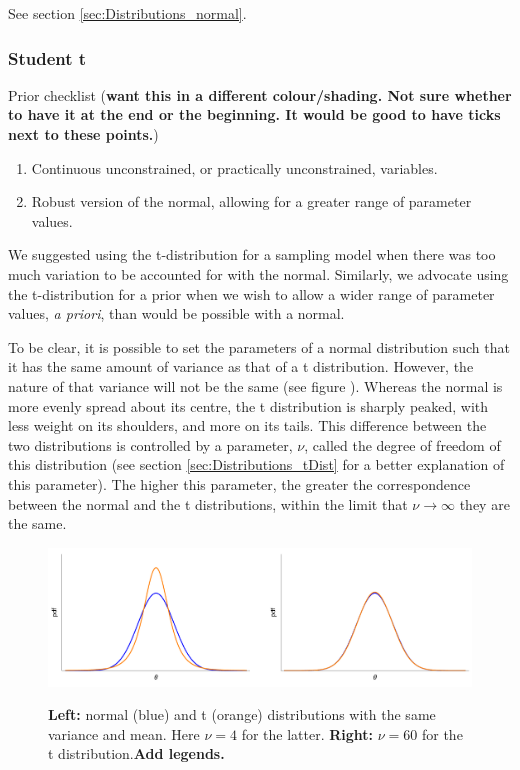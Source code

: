 \documentclass[11pt,fullpage]{book}
\begin{document}
See section \ref{sec:Distributions_normal}.



\subsubsection{Student t}
Prior checklist (\textbf{want this in a different colour/shading. Not sure whether to have it at the end or the beginning. It would be good to have ticks next to these points.})

\begin{enumerate} 
\item Continuous unconstrained, or practically unconstrained, variables.
\item Robust version of the normal, allowing for a greater range of parameter values.
\end{enumerate}

We suggested using the t-distribution for a sampling model when there was too much variation to be accounted for with the normal. Similarly, we advocate using the t-distribution for a prior when we wish to allow a wider range of parameter values, \textit{a priori}, than would be possible with a normal.

To be clear, it is possible to set the parameters of a normal distribution such that it has the same amount of variance as that of a t distribution. However, the nature of that variance will not be the same (see figure ). Whereas the normal is more evenly spread about its centre, the t distribution is sharply peaked, with less weight on its shoulders, and more on its tails. This difference between the two distributions is controlled by a parameter, $\nu$, called the degree of freedom of this distribution (see section \ref{sec:Distributions_tDist} for a better explanation of this parameter). The higher this parameter, the greater the correspondence between the normal and the t distributions, within the limit that $\nu\rightarrow\infty$ they are the same.

\begin{figure}
\centering
\scalebox{0.5} 
{\includegraphics{Distributions_normalTPrior.pdf}}
\caption{\textbf{Left:} normal (blue) and t (orange) distributions with the same variance and mean. Here $\nu=4$ for the latter. \textbf{Right:} $\nu=60$ for the t distribution.\textbf{Add legends.}}\label{fig:Distributions_normalTPrior}
\end{figure}
\end{document}
